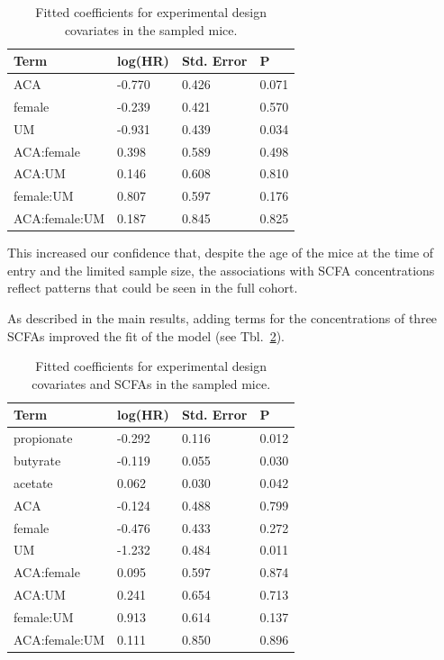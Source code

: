 \documentclass{doc/template/bmcart-nofigbox}
\begin{document}
\begin{table}[h]
\caption{\label{tbl:phreg_null_sampled}Fitted coefficients for experimental design covariates in the sampled mice.}
  \begin{tabular}{llll}
    \hline
    Term & log(HR) & Std. Error & P \\
    \hline
    ACA & -0.770 & 0.426 & 0.071 \\
    female & -0.239 & 0.421 & 0.570 \\
    UM & -0.931 & 0.439 & 0.034 \\
    ACA:female & 0.398 & 0.589 & 0.498 \\
    ACA:UM & 0.146 & 0.608 & 0.810 \\
    female:UM & 0.807 & 0.597 & 0.176 \\
    ACA:female:UM & 0.187 & 0.845 & 0.825 \\
    \hline
  \end{tabular}
\end{table}

This increased our confidence that, despite the age of the mice at the time of
entry and the limited sample size, the associations with SCFA concentrations
reflect patterns that could be seen in the full cohort.

As described in the main results, adding terms for the concentrations of three
SCFAs improved the fit of the model (see Tbl.~\ref{tbl:phreg_main}).

\begin{table}[h]
\caption{\label{tbl:phreg_main}Fitted coefficients for experimental design covariates and SCFAs in the sampled mice.}
  \begin{tabular}{llll}
    \hline
    Term & log(HR) & Std. Error & P \\
    \hline
    propionate & -0.292 & 0.116 & 0.012 \\
    butyrate & -0.119 & 0.055 & 0.030 \\
    acetate & 0.062 & 0.030 & 0.042 \\
    ACA & -0.124 & 0.488 & 0.799 \\
    female & -0.476 & 0.433 & 0.272 \\
    UM & -1.232 & 0.484 & 0.011 \\
    ACA:female & 0.095 & 0.597 & 0.874 \\
    ACA:UM & 0.241 & 0.654 & 0.713 \\
    female:UM & 0.913 & 0.614 & 0.137 \\
    ACA:female:UM & 0.111 & 0.850 & 0.896 \\
    \hline
  \end{tabular}
\end{table}
\end{document}
